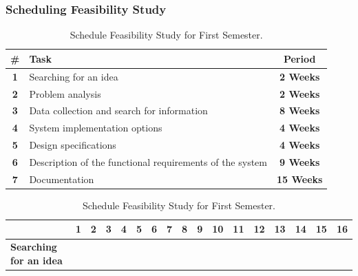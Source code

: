 \documentclass[12pt]{article}
\begin{document}
		\subsubsection{Scheduling Feasibility Study}
			\begin{table}[!h]
				\centering 
				\caption{Scheduling Feasibility Study}
				\begin{subtable}{\textwidth}
					\centering
					\caption{Project Plan for First Semester.}
					\begin{tabular}{|c|l|c|}
						
						\hline
						\rowcolor{lightgray}
						\textbf{ \#} & \textbf{ Task} & \textbf{Period} \\
						\hline
						\textbf{1} & Searching for an idea & \textbf{2 Weeks} \\
						\hline
						\textbf{2} & Problem analysis & \textbf{2 Weeks} \\
						\hline
						\textbf{3} & Data collection and search for information & \textbf{8 Weeks} \\
						\hline
						\textbf{4} & System implementation options &  \textbf{4 Weeks}\\
						\hline
						\textbf{5} & Design specifications & \textbf{4 Weeks}\\
						\hline
						\textbf{6} & Description of the functional requirements of the system & \textbf{9 Weeks} \\
						\hline
						\textbf{7} & Documentation & \textbf{15 Weeks}\\
						\hline
					\end{tabular}
				\end{subtable}
				\begin{center}
				\end{center}
				\begin{subtable}{\textwidth}
					\centering
					\caption{Schedule Feasibility Study for First Semester.}
					\begin{tabular}{|p{2.93cm}|p{0.15cm}|p{0.15cm}|p{0.15cm}|p{0.15cm}|p{0.15cm}|p{0.15cm}|p{0.15cm}|p{0.15cm}|p{0.15cm}|p{0.35cm}|p{0.35cm}|p{0.35cm}|p{0.35cm}|p{0.35cm}|p{0.35cm}|p{0.35cm}|}
						\hline
						\rowcolor{lightgray}
						\backslashbox{Task}{Week} & 
						\textbf{1} & \textbf{2} & \textbf{3} & \textbf{4} & \textbf{5} & \textbf{6} & \textbf{7} & \textbf{8} & \textbf{9} &\textbf{10}&\textbf{11}& \textbf{12} & \textbf{13} & \textbf{14} & \textbf{15} & \textbf{16} \\
						\hline
						\textbf{Searching for an idea} &\cellcolor{darkgray} &\cellcolor{darkgray}&&&&&&&&&&&&&&\\

\end{tabular}
\end{subtable}
\end{table}
\end{document}
